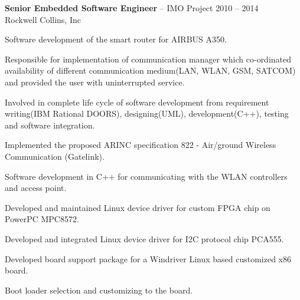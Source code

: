\documentclass{article}
\newcommand{\employer}[4]{{
\vspace*{2pt}%
\textbf{#1} #2 \hfill #3\\ #4 \vspace*{2pt}}
}
\renewcommand{\labelitemii}{
	\raisebox{0.3ex}{\tiny\textbullet}
}
\newenvironment{bullet-list-minor}{
\begin{list}{\labelitemii}{\setlength\leftmargin{15pt} 
\topsep 0pt \itemsep -2pt}}{\vspace*{4pt}\end{list}
}
\begin{document}
    \employer{Senior Embedded Software Engineer}{-- IMO Project}{2010 -- 2014}
    {Rockwell Collins, Inc}
    \begin{bullet-list-minor}
    \item Software development of the smart router for AIRBUS A350.
    \item Responsible for implementation of communication manager which co-ordinated availability of 
	    different communication medium(LAN, WLAN, GSM, SATCOM) and provided the user with uninterrupted service.
    \item Involved in complete life cycle of software development from
requirement writing(IBM Rational DOORS), designing(UML), development(C++), testing and software integration.

    \item Implemented the proposed ARINC specification 822 - Air/ground
Wireless Communication (Gatelink).
    \item Software development in C++ for communicating with the WLAN controllers and
access point.


    \item Developed and maintained Linux device driver for custom FPGA chip on PowerPC MPC8572.
    \item Developed and integrated Linux device driver for I2C protocol chip PCA555.

    \item Developed board support package for a Windriver Linux based customized x86 board.
    \item Boot loader selection and customizing to the board.
    \end{bullet-list-minor}
\end{document}
